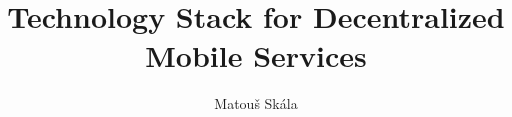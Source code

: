 \documentclass[whitelogo]{tudelft-report}
\begin{document}
\frontmatter


\title[tudelft-white]{Technology Stack for Decentralized Mobile Services}
\author[tudelft-white]{Matouš Skála}


%






\tableofcontents

\mainmatter



%

%

%

%

\appendix

%


\end{document}
